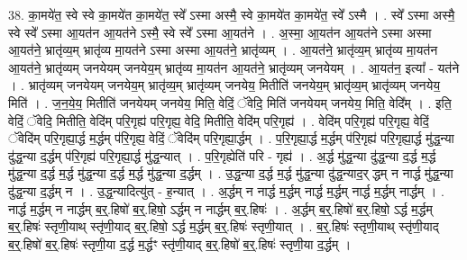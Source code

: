 \documentclass[17pt]{extarticle}
\begin{document}
38. का॒मये॑त॒ स्वे स्वे का॒मये॑त का॒मये॑त॒ स्वे᳚ ऽस्मा अस्मै॒ स्वे का॒मये॑त का॒मये॑त॒ स्वे᳚ ऽस्मै । . स्वे᳚ ऽस्मा अस्मै॒ स्वे स्वे᳚ ऽस्मा आ॒यत॑न आ॒यत॑ने ऽस्मै॒ स्वे स्वे᳚ ऽस्मा आ॒यत॑ने । . अ॒स्मा॒ आ॒यत॑न आ॒यत॑ने ऽस्मा अस्मा आ॒यत॑ने॒ भ्रातृ॑व्य॒म् भ्रातृ॑व्य मा॒यत॑ने ऽस्मा अस्मा आ॒यत॑ने॒ भ्रातृ॑व्यम् । . आ॒यत॑ने॒ भ्रातृ॑व्य॒म् भ्रातृ॑व्य मा॒यत॑न आ॒यत॑ने॒ भ्रातृ॑व्यम् जनयेयम् जनयेय॒म् भ्रातृ॑व्य मा॒यत॑न आ॒यत॑ने॒ भ्रातृ॑व्यम् जनयेयम् । . आ॒यत॑न॒ इत्या᳚ - यत॑ने । . भ्रातृ॑व्यम् जनयेयम् जनयेय॒म् भ्रातृ॑व्य॒म् भ्रातृ॑व्यम् जनयेय॒ मितीति॑ जनयेय॒म् भ्रातृ॑व्य॒म् भ्रातृ॑व्यम् जनयेय॒ मिति॑ । . ज॒न॒ये॒य॒ मितीति॑ जनयेयम् जनयेय॒ मिति॒ वेदिं॒ ॅवेदि॒ मिति॑ जनयेयम् जनयेय॒ मिति॒ वेदि᳚म् । . इति॒ वेदिं॒ ॅवेदि॒ मितीति॒ वेदि॑म् परि॒गृह्य॑ परि॒गृह्य॒ वेदि॒ मितीति॒ वेदि॑म् परि॒गृह्य॑ । . वेदि॑म् परि॒गृह्य॑ परि॒गृह्य॒ वेदिं॒ ॅवेदि॑म् परि॒गृह्या॒र्द्ध म॒र्द्धम् प॑रि॒गृह्य॒ वेदिं॒ ॅवेदि॑म् परि॒गृह्या॒र्द्धम् । . प॒रि॒गृह्या॒र्द्ध म॒र्द्धम् प॑रि॒गृह्य॑ परि॒गृह्या॒र्द्ध मु॑द्ध॒न्या दु॑द्ध॒न्या द॒र्द्धम् प॑रि॒गृह्य॑ परि॒गृह्या॒र्द्ध मु॑द्ध॒न्यात् । . प॒रि॒गृह्येति॑ परि - गृह्य॑ । . अ॒र्द्ध मु॑द्ध॒न्या दु॑द्ध॒न्या द॒र्द्ध म॒र्द्ध मु॑द्ध॒न्या द॒र्द्ध म॒र्द्ध मु॑द्ध॒न्या द॒र्द्ध म॒र्द्ध मु॑द्ध॒न्या द॒र्द्धम् । . उ॒द्ध॒न्या द॒र्द्ध म॒र्द्ध मु॑द्ध॒न्या दु॑द्ध॒न्याद॒र् द्धम् न नार्द्ध मु॑द्ध॒न्या दु॑द्ध॒न्या द॒र्द्धम् न । . उ॒द्ध॒न्यादित्यु॑त् - ह॒न्यात् । . अ॒र्द्धम् न नार्द्ध म॒र्द्धम् नार्द्ध म॒र्द्धम् नार्द्ध म॒र्द्धम् नार्द्धम् । . नार्द्ध म॒र्द्धम् न नार्द्धम् ब॒र्॒.हिषो॑ ब॒र्॒.हिषो॒ ऽर्द्धम् न नार्द्धम् ब॒र्॒.हिषः॑ । . अ॒र्द्धम् ब॒र्॒.हिषो॑ ब॒र्॒.हिषो॒ ऽर्द्ध म॒र्द्धम् ब॒र्॒.हिषः॑ स्तृणी॒याथ् स्तृ॑णी॒याद् ब॒र्॒.हिषो॒ ऽर्द्ध म॒र्द्धम् ब॒र्॒.हिषः॑ स्तृणी॒यात् । . ब॒र्॒.हिषः॑ स्तृणी॒याथ् स्तृ॑णी॒याद् ब॒र्॒.हिषो॑ ब॒र्॒.हिषः॑ स्तृणी॒या द॒र्द्ध म॒र्द्धꣳ स्तृ॑णी॒याद् ब॒र्॒.हिषो॑ ब॒र्॒.हिषः॑ स्तृणी॒या द॒र्द्धम् । \newline
\end{document}
